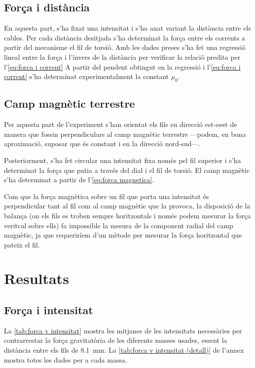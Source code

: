 \subsection{Força i distància}
En aquesta part, s'ha fixat una intensitat i s'ha anat variant la distància entre els cables. Per cada distància desitjada s'ha determinat la força entre els corrents a partir del mecanisme el fil de torsió. Amb les dades preses s'ha fet una regressió lineal entre la força i l'invers de la distància per verificar la relació predita per l'\cref{eq:forca i corrent} A partir del pendent obtingut en la regressió i l'\cref{eq:forca i corrent} s'ha determinat experimentalment la constant $\mu_0$.

\subsection{Camp magnètic terrestre}
Per aquesta part de l'experiment %
s'han orientat els fils en direcció est-oest de manera que fossin perpendiculars al camp magnètic terrestre ---podem, en bona aproximació, suposar que és constant i en la direcció nord-sud---. 

Posteriorment, s'ha fet circular una intensitat fixa només pel fil superior i s'ha determinat la força que patia a través del dial i el fil de torsió. El camp magnètic s'ha determinat a partir de l'\cref{eq:forca magnetica}. 

Com que la força magnètica sobre un fil que porta una intensitat és perpendicular tant al fil com al camp magnètic que la provoca, la disposició de la balança (on els fils es troben sempre horitzontals i només podem mesurar la força veritcal sobre ells) fa impossible la mesura de la component radial del camp magnètic, ja que requeriríem d'un mètode per mesurar la força horitzontal que pateix el fil.

\section{Resultats}
\subsection{Força i intensitat}
La \cref{tab:forca v intensitat} mostra les mitjanes de les intensitats necessàries per contrarrestar la força gravitatòria de les diferents masses usades, essent la distància entre els fils de \SI{8.1}{mm}. La \cref{tab:forca v intensitat (detall)}	de l'annex mostra totes les dades per a cada massa. 

